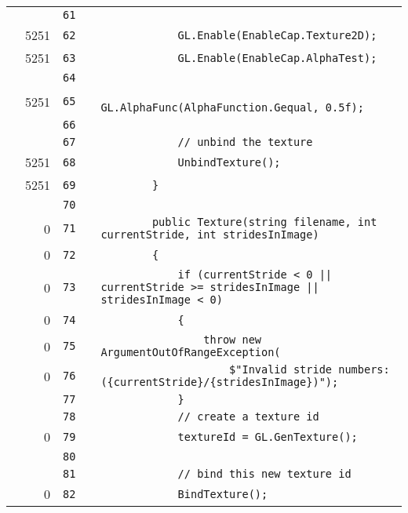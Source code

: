 \documentclass[a4paper,landscape,10pt]{article}
\begin{document}
\begin{longtable}[l]{lrrll}
\cellcolor{gray} &  & \verb~61~ & & \verb~~\\
\cellcolor{green} & 5251 & \verb~62~ & & \verb~            GL.Enable(EnableCap.Texture2D);~\\
\cellcolor{green} & 5251 & \verb~63~ & & \verb~            GL.Enable(EnableCap.AlphaTest);~\\
\cellcolor{gray} &  & \verb~64~ & & \verb~~\\
\cellcolor{green} & 5251 & \verb~65~ & & \verb~            GL.AlphaFunc(AlphaFunction.Gequal, 0.5f);~\\
\cellcolor{gray} &  & \verb~66~ & & \verb~~\\
\cellcolor{gray} &  & \verb~67~ & & \verb~            // unbind the texture~\\
\cellcolor{green} & 5251 & \verb~68~ & & \verb~            UnbindTexture();~\\
\cellcolor{green} & 5251 & \verb~69~ & & \verb~        }~\\
\cellcolor{gray} &  & \verb~70~ & & \verb~~\\
\cellcolor{red} & 0 & \verb~71~ & & \verb~        public Texture(string filename, int currentStride, int stridesInImage)~\\
\cellcolor{red} & 0 & \verb~72~ & & \verb~        {~\\
\cellcolor{red} & 0 & \verb~73~ & & \verb~            if (currentStride < 0 || currentStride >= stridesInImage || stridesInImage < 0)~\\
\cellcolor{red} & 0 & \verb~74~ & & \verb~            {~\\
\cellcolor{red} & 0 & \verb~75~ & & \verb~                throw new ArgumentOutOfRangeException(~\\
\cellcolor{red} & 0 & \verb~76~ & & \verb~                    $"Invalid stride numbers: ({currentStride}/{stridesInImage})");~\\
\cellcolor{gray} &  & \verb~77~ & & \verb~            }~\\
\cellcolor{gray} &  & \verb~78~ & & \verb~            // create a texture id~\\
\cellcolor{red} & 0 & \verb~79~ & & \verb~            textureId = GL.GenTexture();~\\
\cellcolor{gray} &  & \verb~80~ & & \verb~~\\
\cellcolor{gray} &  & \verb~81~ & & \verb~            // bind this new texture id~\\
\cellcolor{red} & 0 & \verb~82~ & & \verb~            BindTexture();~\\

\end{longtable}
\end{document}
